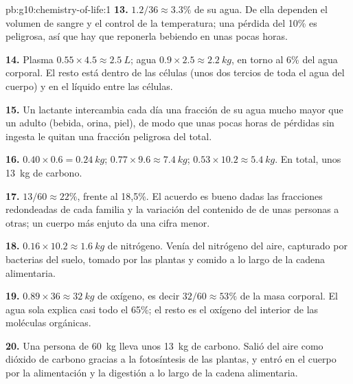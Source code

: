 \begin{solution}{pb:g10:chemistry-of-life:1}
\textbf{13.} $1.2/36 \approx 3.3\%$ de su agua. De ella dependen el
volumen de sangre y el control de la temperatura; una pérdida del 10\%
es peligrosa, así que hay que reponerla bebiendo en unas pocas horas.

\textbf{14.} Plasma $0.55 \times 4.5 \approx \qty{2.5}{L}$; agua $0.9
\times 2.5 \approx \qty{2.2}{kg}$, en torno al 6\% del agua corporal.
El resto está dentro de las células (unos dos tercios de toda el agua
del cuerpo) y en el líquido entre las células.

\textbf{15.} Un lactante intercambia cada día una fracción de su agua
mucho mayor que un adulto (bebida, orina, piel), de modo que unas pocas
horas de pérdidas sin ingesta le quitan una fracción peligrosa del
total.

\textbf{16.}  $0.40 \times 0.6 = \qty{0.24}{kg}$;  $0.77 \times 9.6 \approx \qty{7.4}{kg}$;  $0.53 \times 10.2
\approx \qty{5.4}{kg}$. En total, unos \qty{13}{kg} de carbono.

\textbf{17.} $13/60 \approx 22\%$, frente al 18,5\%. El acuerdo es
bueno dadas las fracciones redondeadas de cada familia y la variación
del contenido de  de unas personas a otras; un cuerpo más enjuto
da una cifra menor.

\textbf{18.} $0.16 \times 10.2 \approx \qty{1.6}{kg}$ de nitrógeno.
Venía del nitrógeno del aire, capturado por bacterias del suelo, tomado
por las plantas y comido a lo largo de la cadena alimentaria.

\textbf{19.} $0.89 \times 36 \approx \qty{32}{kg}$ de oxígeno, es decir
$32/60 \approx 53\%$ de la masa corporal. El agua sola explica casi
todo el 65\%; el resto es el oxígeno del interior de las moléculas
orgánicas.

\textbf{20.} Una persona de \qty{60}{kg} lleva unos \qty{13}{kg} de
carbono. Salió del aire como dióxido de carbono gracias a la
fotosíntesis de las plantas, y entró en el cuerpo por la alimentación y
la digestión a lo largo de la cadena alimentaria.
\end{solution}
